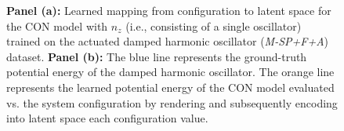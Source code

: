 \begin{figure}[ht]
    \centering
    \caption{
    \textbf{Panel (a):} Learned mapping from configuration to latent space for the CON model with $n_z$ (i.e., consisting of a single oscillator) trained on the actuated damped harmonic oscillator (\emph{M-SP+F+A}) dataset. \textbf{Panel (b):} The blue line represents the ground-truth potential energy of the damped harmonic oscillator. The orange line represents the learned potential energy of the CON model evaluated vs. the system configuration by rendering and subsequently encoding into latent space each configuration value.
    }\label{fig:con:control:m-sp+f+a:analysis}
\end{figure}

